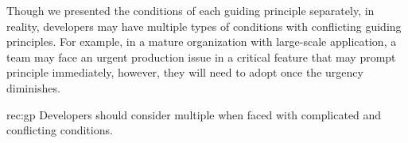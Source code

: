 Though we presented the conditions of each guiding principle separately, in reality, developers may have multiple types of conditions with conflicting guiding principles. For example, in a mature organization with large-scale application, a team may face an urgent production issue in a critical feature that may prompt  principle immediately, however, they will need to adopt  once the urgency diminishes. %
\begin{recommendation}{rec:gp}
Developers should consider multiple {\principle} when faced with complicated and conflicting conditions. 
\end{recommendation}\medskip

